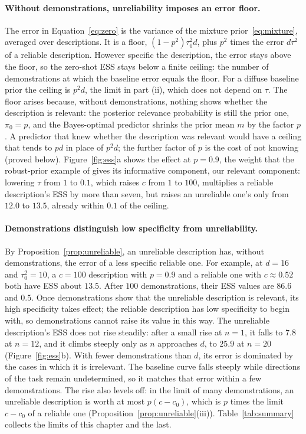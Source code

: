 \paragraph{Without demonstrations, unreliability imposes an error floor.}
The error in Equation~\eqref{eq:zero} is the variance of the mixture prior~\eqref{eq:mixture}, averaged over descriptions. It is a floor, $(1-p^2)\tau_0^2d$, plus $p^2$ times the error $d\tau^2$ of a reliable description. However specific the description, the error stays above the floor, so the zero-shot ESS stays below a finite ceiling: the number of demonstrations at which the baseline error equals the floor. For a diffuse baseline prior the ceiling is $p^2d$, the limit in part (ii), which does not depend on $\tau$. The floor arises because, without demonstrations, nothing shows whether the description is relevant: the posterior relevance probability is still the prior one, $\pi_0=p$, and the Bayes-optimal predictor shrinks the prior mean $m$ by the factor $p$. A predictor that knew whether the description was relevant would have a ceiling that tends to $pd$ in place of $p^2d$; the further factor of $p$ is the cost of not knowing (proved below). Figure~\ref{fig:ess}a shows the effect at $p=0.9$, the weight that the robust-prior example of \citet{schmidli2014} gives its informative component, our relevant component: lowering $\tau$ from $1$ to $0.1$, which raises $c$ from $1$ to $100$, multiplies a reliable description's ESS by more than seven, but raises an unreliable one's only from $12.0$ to $13.5$, already within $0.1$ of the ceiling.

\paragraph{Demonstrations distinguish low specificity from unreliability.}
By Proposition~\ref{prop:unreliable}, an unreliable description has, without demonstrations, the error of a less specific reliable one. For example, at $d=16$ and $\tau_0^2=10$, a $c=100$ description with $p=0.9$ and a reliable one with $c\approx0.52$ both have ESS about $13.5$. After $100$ demonstrations, their ESS values are $86.6$ and $0.5$. Once demonstrations show that the unreliable description is relevant, its high specificity takes effect; the reliable description has low specificity to begin with, so demonstrations cannot raise its value in this way. The unreliable description's ESS does not rise steadily: after a small rise at $n=1$, it falls to $7.8$ at $n=12$, and it climbs steeply only as $n$ approaches $d$, to $25.9$ at $n=20$ (Figure~\ref{fig:ess}b). With fewer demonstrations than $d$, its error is dominated by the cases in which it is irrelevant. The baseline curve falls steeply while directions of the task remain undetermined, so it matches that error within a few demonstrations. The rise also levels off: in the limit of many demonstrations, an unreliable description is worth at most $p(c-c_0)$, which is $p$ times the limit $c-c_0$ of a reliable one (Proposition~\ref{prop:unreliable}(iii)). Table~\ref{tab:summary} collects the limits of this chapter and the last.


